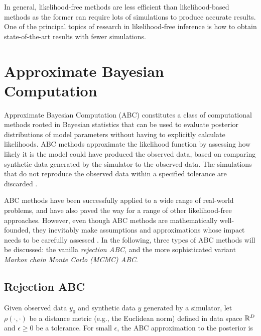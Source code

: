 In general, likelihood-free methods are less efficient than likelihood-based methods as the former can require lots of simulations to produce accurate results. One of the principal topics of research in likelihood-free inference is how to obtain state-of-the-art results with fewer simulations. 

\section{Approximate Bayesian Computation}\label{sec:abc}

Approximate Bayesian Computation (ABC) constitutes a class of computational methods rooted in Bayesian statistics that can be used to evaluate posterior distributions of model parameters without having to explicitly calculate likelihoods. ABC methods approximate the likelihood function by assessing how likely it is the model could have produced the observed data, based on comparing synthetic data generated by the simulator to the observed data. The simulations that do not reproduce the observed data within a specified tolerance are discarded \cite{ABCprimer}.

ABC methods have been successfully applied to a wide range of real-world problems, and have also paved the way for a range of other likelihood-free approaches. However, even though ABC methods are mathematically well-founded, they inevitably make assumptions and approximations whose impact needs to be carefully assessed \cite{ABCprimer}. In the following, three types of ABC methods will be discussed: the vanilla \textit{rejection ABC}, and the more sophisticated variant \textit{Markov chain Monte Carlo (MCMC) ABC}.


\subsection{Rejection ABC}\label{sec:rejection_abc}

Given observed data $y_0$ and synthetic data $y$ generated by a simulator, let $\rho (\cdot, \cdot)$ be a distance metric (e.g., the Euclidean norm) defined in data space $\mathbb{R}^D$ and $\epsilon \geq 0$ be a tolerance. For small $\epsilon$, the ABC approximation to the posterior is 

